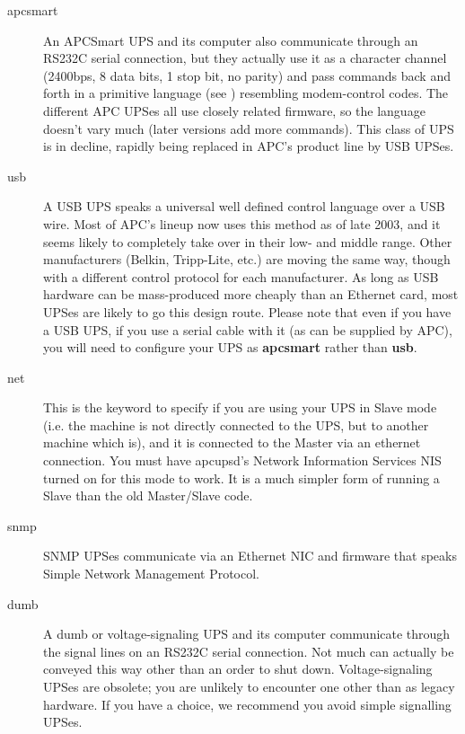 \begin{description}

\item [apcsmart]
   An APCSmart UPS and its computer also communicate through an RS232C serial
connection, but they actually use it as a character channel (2400bps, 8 data
bits, 1 stop bit, no parity) and pass commands back and forth in a primitive
language (see 
) resembling
modem-control codes.  The different APC UPSes all use closely related
firmware, so the language doesn't vary much (later versions add more
commands).  This class of UPS is in decline, rapidly being replaced in APC's
product line by USB UPSes.  

\item [usb]
   A USB UPS speaks a universal well defined control language over a USB wire. 
Most of APC's lineup now uses this method as of late 2003, and it seems likely
to completely take over in their low- and middle range.  Other manufacturers
(Belkin, Tripp-Lite, etc.) are moving the same way, though with a different
control protocol for each manufacturer.  As long as USB hardware can be
mass-produced more cheaply than an Ethernet card, most UPSes are likely to go
this design route. Please note that even if you have a USB UPS, if you use a
serial cable with it (as can be supplied by APC), you will need to configure
your UPS as {\bf apcsmart} rather than {\bf usb}.  

\item [net]
   This is the keyword to specify if you are using your UPS in Slave mode (i.e.
the machine is not directly connected to the UPS, but to another machine which
is), and it is connected to the Master via an ethernet connection. You must
have apcupsd's Network Information Services NIS turned on for this mode to
work. It is a much simpler form of running a Slave than the old Master/Slave
code.  

\item [snmp]
   SNMP UPSes communicate via an Ethernet NIC and firmware that speaks Simple
Network Management Protocol.  

\item [dumb]
   A dumb or voltage-signaling UPS and its computer communicate through the
signal lines on an RS232C serial connection.  Not much can actually be
conveyed this way other than an order to shut down. Voltage-signaling UPSes
are obsolete; you are unlikely to encounter one other than as legacy hardware.
If you have a choice, we recommend you avoid simple signalling UPSes.  
\end{description}

